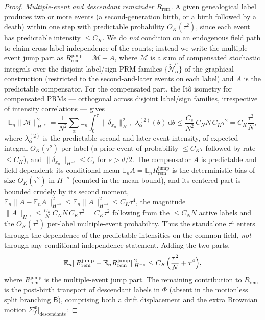 \documentclass[a4paper,fleqn]{cas-sc}
\theoremstyle{definition}
\theoremstyle{remark}
\begin{document}
\begin{proof}
\emph{Multiple-event and descendant remainder $R_{\mathrm{rem}}$.} A given genealogical
label produces two or more events (a second-generation birth, or a birth followed by a
death) within one step with predictable probability $O_K(\tau^2)$, since each event has
predictable intensity $\le C_K$. We do \emph{not} condition on an endogenous field path
to claim cross-label independence of the counts; instead we write the multiple-event
jump part as $R^{\mathrm{jump}}_{\mathrm{rem}}=\mathcal M+A$, where $\mathcal M$ is a sum
of compensated stochastic integrals over the disjoint label/sign PRM families
$\{\widetilde{\mathcal N}^\sigma_\alpha\}$ of the graphical construction (restricted to
the second-and-later events on each label) and $A$ is the predictable compensator. For
the compensated part, the It\^o isometry for compensated PRMs --- orthogonal across
disjoint label/sign families, irrespective of intensity correlations --- gives
\[
\mathbb E_n\|\mathcal M\|_{H^{-s}}^2
=\frac1{N^2}\sum_{\alpha}\mathbb E_n\!\int_0^\tau\!\|\delta_{x_\alpha}\|_{H^{-s}}^2\,\lambda^{(2)}_\alpha(\theta)\,\mathrm d\theta
\le\frac{C_s}{N^2}\,C_NN\,C_K\tau^2=C_K\frac{\tau^2}{N},
\]
where $\lambda^{(2)}_\alpha$ is the predictable second-and-later-event intensity, of
expected integral $O_K(\tau^2)$ per label (a prior event of probability $\le C_K\tau$
followed by rate $\le C_K$), and $\|\delta_{x_\alpha}\|_{H^{-s}}\le C_s$ for $s>d/2$. The
compensator $A$ is predictable and field-dependent; its conditional mean
$\mathbb E_nA=\mathbb E_nR^{\mathrm{jump}}_{\mathrm{rem}}$ is the deterministic bias of
size $O_K(\tau^2)$ in $H^{-s}$ (counted in the mean bound), and its centered part is
bounded crudely by its second moment,
$\mathbb E_n\|A-\mathbb E_nA\|_{H^{-s}}^2\le\mathbb E_n\|A\|_{H^{-s}}^2\le C_K\tau^4$, the
magnitude $\|A\|_{H^{-s}}\le\frac{C_K}{N}\,C_NN\,C_K\tau^2=C_K\tau^2$ following from the
$\le C_NN$ active labels and the $O_K(\tau^2)$ per-label multiple-event probability. Thus
the standalone $\tau^4$ enters through the dependence of the predictable intensities on
the common field, \emph{not} through any conditional-independence statement. Adding the
two parts,
\[
\mathbb E_n\|R^{\mathrm{jump}}_{\mathrm{rem}}-\mathbb E_nR^{\mathrm{jump}}_{\mathrm{rem}}\|_{H^{-s}}^2\le C_K\Bigl(\frac{\tau^2}{N}+\tau^4\Bigr),
\]
where $R^{\mathrm{jump}}_{\mathrm{rem}}$ is the multiple-event jump part. The
remaining contribution to $R_{\mathrm{rem}}$ is the post-birth transport of descendant
labels in $\Phi$ (absent in the motionless split branching $\mathsf B$), comprising both
a drift displacement and the extra Brownian motion $\Sigma^\Phi_f|_{\mathrm{descendants}}$:

\end{proof}
\end{document}
